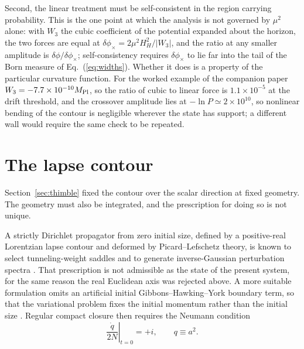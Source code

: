 \documentclass[aps,prd,twocolumn,superscriptaddress,nofootinbib,longbibliography]{revtex4-2}
\newcommand{\Mpl}{M_{\rm Pl}}
\begin{document}
Second, the linear treatment must be self-consistent in the region carrying
probability. This is the one point at which the analysis is not governed by
$\mu^2$ alone: with $W_3$ the cubic coefficient of the potential expanded
about the horizon, the two forces are equal at
$\delta\phi_\times=2\mu^2H_H^2/|W_3|$, and the ratio at any smaller
amplitude is $\delta\phi/\delta\phi_\times$; self-consistency requires
$\delta\phi_\times$ to lie far into the tail of the Born measure of
Eq.~(\ref{eq:widths}). Whether it does is a property of the particular
curvature function. For the worked example of the companion paper
$W_3=-7.7\times10^{-10}\Mpl$, so the ratio
of cubic to linear force is $1.1\times10^{-5}$ at the drift threshold, and the
crossover amplitude lies at $-\ln P\simeq2\times10^{10}$, so nonlinear
bending of the contour is negligible wherever the state has support; a
different wall would require the same check to be repeated.

\section{The lapse contour}
\label{sec:lapse}
Section~\ref{sec:thimble} fixed the contour over the scalar direction at
fixed geometry. The geometry must also be integrated, and the prescription
for doing so is not unique.

A strictly Dirichlet propagator from zero initial size, defined by a
positive-real Lorentzian lapse contour and deformed by Picard--Lefschetz
theory, is known to select tunneling-weight saddles and to generate
inverse-Gaussian perturbation spectra \cite{FLT2017,FLT2017b}. That
prescription is not admissible as the state of the present system, for the
same reason the real Euclidean axis was rejected above. A more suitable
formulation omits an artificial initial Gibbons--Hawking--York boundary term,
so that the variational problem fixes the initial momentum rather than the
initial size \cite{DiTucciLehners2019,DiTucci2019}. Regular compact
closure then requires the
Neumann condition
\begin{equation}
\left.\frac{\dot q}{2N}\right|_{t=0}=+i,
\qquad q\equiv a^2 .
\label{eq:neumann}
\end{equation}
\end{document}
